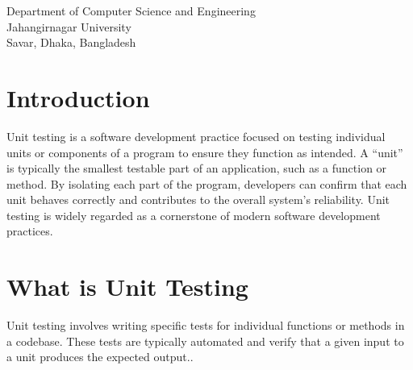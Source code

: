 \documentclass[a4paper,12pt]{article}
\begin{document}
\begin{center}
\begin{table}[h!]
\begin{tabular}{|c|c|c|c|}
        \end{tabular}
    \end{table}

    \vspace{1cm}

    Department of Computer Science and Engineering\\
    Jahangirnagar University\\
    Savar, Dhaka, Bangladesh\\
\end{center}

\newpage

\tableofcontents

\newpage
\pagestyle{fancy}
\fancyhf{}
\fancyfoot[C]{\thepage} %
\section{Introduction}
Unit testing is a software development practice focused on testing individual units or components of a program
to ensure they function as intended. A “unit” is typically the smallest testable part of an application, such
as a function or method. By isolating each part of the program, developers can confirm that each unit behaves
correctly and contributes to the overall system’s reliability. Unit testing is widely regarded as a
cornerstone of modern software development practices.
\section{What is Unit Testing}
Unit testing involves writing specific tests for individual functions or methods in a codebase. These tests
are typically automated and verify that a given input to a unit produces the expected output..
\end{document}
